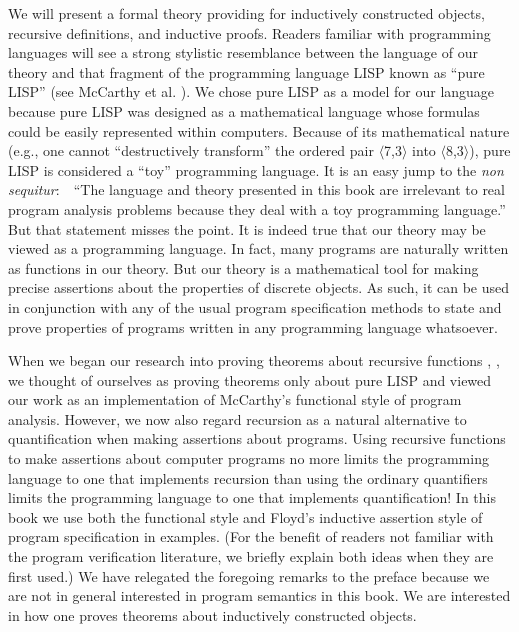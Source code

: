 \documentclass[11pt]{book}
\newcommand{\pubinlineunderline}[1]{\emph{#1}}
\begin{document}
We will present a formal theory providing for inductively
constructed objects, recursive definitions, and inductive proofs.
Readers familiar with programming languages will see a strong stylistic
resemblance between the language of our theory and that fragment of
the programming language LISP known as ``pure LISP'' (see McCarthy et al. \cite{LISPMANUAL}).
We chose pure LISP as a model for our language because
pure LISP was designed as a mathematical language 
whose formulas could be easily represented within
computers.  Because of its mathematical nature (e.g., one cannot
``destructively transform'' the ordered pair $\langle$7,3$\rangle$ into
$\langle$8,3$\rangle$),
pure LISP is considered a ``toy'' programming language.
It is an easy jump to the \pubinlineunderline{non sequitur}:~~``The language
and theory presented in this book are
irrelevant to real program analysis
problems because they deal with a toy programming language.''
But that statement misses the point.  It is indeed true that our theory may be viewed
as a programming language.  In fact, many programs are naturally written as functions
in our theory.
  But our theory is a mathematical tool for making precise assertions
about the properties of discrete objects.  As such, it can be used in
conjunction with any of the usual program specification methods to state and  prove
properties of programs written in any programming language
whatsoever.

When
we began our research into
proving theorems about recursive functions \cite{JACM}, \cite{THESIS},
we thought of ourselves as proving theorems only about pure LISP
and viewed our work as an implementation of
McCarthy's \cite{MCCARTHYBASIS} functional style of program analysis.
However, we now also regard  recursion
as a   natural
alternative to quantification  when making assertions about programs.
Using recursive functions to make assertions about computer programs
no more limits the programming language to one
that implements recursion  than using the ordinary quantifiers
limits the programming language to one that implements quantification!
In this book we use both the functional style and Floyd's inductive
assertion style \cite{FLOYD}  of program specification in examples. (For the benefit of
readers not familiar with the program verification literature,
we briefly explain both ideas when they are first used.)
We have relegated the foregoing remarks to the preface because
we are not in general interested in program semantics in this book.
We are interested in how one proves theorems about inductively
constructed objects.
\end{document}
